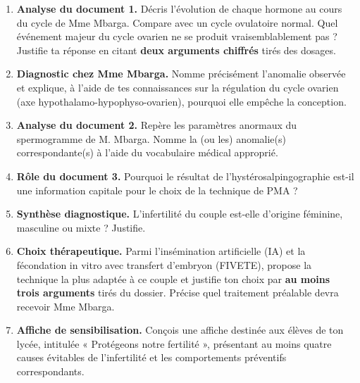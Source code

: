 \documentclass[11pt]{article}
\newcounter{popsec}
\newcounter{popsub}
\newcommand{\courssub}[1]{%
  \stepcounter{popsub}%
  \par\vspace{9pt}\noindent{\popxbold\fontsize{11.5}{13}\selectfont\color{popink}{\color{poporange}\thepopsec.\thepopsub}\hspace{6pt}#1}\par\nopagebreak\vspace{4pt}
}
\begin{document}
\begin{enumerate}
\item \textbf{Analyse du document 1.} Décris l'évolution de chaque hormone au cours du cycle de Mme Mbarga. Compare avec un cycle ovulatoire normal. Quel événement majeur du cycle ovarien ne se produit vraisemblablement pas ? Justifie ta réponse en citant \textbf{deux arguments chiffrés} tirés des dosages.
\item \textbf{Diagnostic chez Mme Mbarga.} Nomme précisément l'anomalie observée et explique, à l'aide de tes connaissances sur la régulation du cycle ovarien (axe hypothalamo-hypophyso-ovarien), pourquoi elle empêche la conception.
\item \textbf{Analyse du document 2.} Repère les paramètres anormaux du spermogramme de M. Mbarga. Nomme la (ou les) anomalie(s) correspondante(s) à l'aide du vocabulaire médical approprié.
\item \textbf{Rôle du document 3.} Pourquoi le résultat de l'hystérosalpingographie est-il une information capitale pour le choix de la technique de PMA ?
\item \textbf{Synthèse diagnostique.} L'infertilité du couple est-elle d'origine féminine, masculine ou mixte ? Justifie.
\item \textbf{Choix thérapeutique.} Parmi l'insémination artificielle (IA) et la fécondation in vitro avec transfert d'embryon (FIVETE), propose la technique la plus adaptée à ce couple et justifie ton choix par \textbf{au moins trois arguments} tirés du dossier. Précise quel traitement préalable devra recevoir Mme Mbarga.
\item \textbf{Affiche de sensibilisation.} Conçois une affiche destinée aux élèves de ton lycée, intitulée « Protégeons notre fertilité », présentant au moins quatre causes évitables de l'infertilité et les comportements préventifs correspondants.
\end{enumerate}

\courssub{Ressources à mobiliser}
\end{document}
